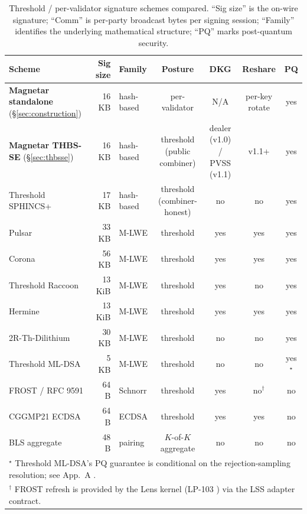\begin{table}[H]
\centering
\small
\caption{Threshold / per-validator signature schemes compared.
``Sig size'' is the on-wire signature; ``Comm'' is per-party
broadcast bytes per signing session; ``Family'' identifies the
underlying mathematical structure; ``PQ'' marks post-quantum
security.}
\label{tab:comparison}
\begin{tabular}{lrlcccc}
\toprule
Scheme & Sig size & Family & Posture & DKG & Reshare & PQ \\
\midrule
\textbf{Magnetar standalone} (\S\ref{sec:construction}) & 16 KB & hash-based & per-validator & N/A & per-key rotate & yes \\
\textbf{Magnetar THBS-SE} (\S\ref{sec:thbsse}) & 16 KB & hash-based & threshold (public combiner) & dealer (v1.0) / PVSS (v1.1) & v1.1+ & yes \\
Threshold SPHINCS+ \cite{cosmin2021} & 17 KB & hash-based & threshold (combiner-honest) & no & no & yes \\
Pulsar \cite{lp073pulsarpaper} & 33 KB & M-LWE       & threshold & yes & yes & yes \\
Corona \cite{lp104corona} & 56 KB & M-LWE          & threshold & yes & yes & yes \\
Threshold Raccoon \cite{thresholdraccoon} & 13 KiB & M-LWE & threshold & yes & no & yes \\
Hermine \cite{hermine} & 13 KiB & M-LWE           & threshold & yes & yes & yes \\
2R-Th-Dilithium \cite{damgard2021} & 30 KB & M-LWE   & threshold & no & no & yes \\
Threshold ML-DSA \cite{tmldsa2025} & 5 KB & M-LWE & threshold & no & no & yes${}^\star$ \\
FROST / RFC 9591 \cite{rfc9591} & 64 B & Schnorr   & threshold & yes & no${}^\dagger$ & no \\
CGGMP21 ECDSA \cite{cggmp21} & 64 B & ECDSA        & threshold & yes & yes & no \\
BLS aggregate \cite{bls} & 48 B & pairing          & $K$-of-$K$ aggregate & no & no & no \\
\bottomrule
\multicolumn{7}{l}{\footnotesize ${}^\star$ Threshold ML-DSA's PQ guarantee is
conditional on the rejection-sampling resolution; see App.~A
\cite{quasarcertsoundness}.} \\
\multicolumn{7}{l}{\footnotesize ${}^\dagger$ FROST refresh is provided by
the Lens kernel (LP-103 \cite{lp103}) via the LSS adapter
contract.}
\end{tabular}
\end{table}

